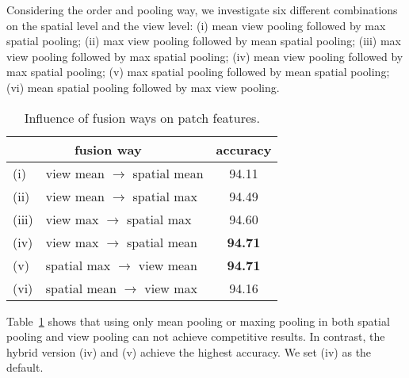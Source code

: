 \documentclass[11pt]{article}
\begin{document}
Considering the order and pooling way, we investigate six different combinations on the spatial level and the view level: (i) mean view pooling followed by max spatial pooling; (ii)  max view pooling followed by mean spatial pooling; (iii) max view pooling followed by max spatial pooling; (iv) mean view pooling followed by max spatial pooling; (v) max spatial pooling followed by mean spatial pooling; (vi) mean spatial pooling followed by max view pooling.




\begin{table}[ht]
\caption{Influence of fusion ways on patch features.}
\label{tab:pool}
\centering
\begin{tabular}{l@{}lc}
\toprule
\multicolumn{2}{c}{fusion way} & accuracy \\
\midrule
(i) & view mean $\rightarrow$ spatial mean & 94.11 \\
(ii) & view mean $\rightarrow$ spatial max & 94.49 \\
(iii) & view max $\rightarrow$ spatial max & 94.60 \\
(iv) & view max $\rightarrow$ spatial mean & \textbf{94.71} \\
(v) & spatial max $\rightarrow$ view mean & \textbf{94.71} \\
(vi) & spatial mean $\rightarrow$ view max & 94.16 \\
\bottomrule
\end{tabular}
\end{table}

Table~\ref{tab:pool} shows that using only mean pooling or maxing pooling in both spatial pooling and view pooling can not achieve competitive results. In contrast, the hybrid version (iv) and (v) achieve the highest accuracy. We set (iv) as the default.
\end{document}
